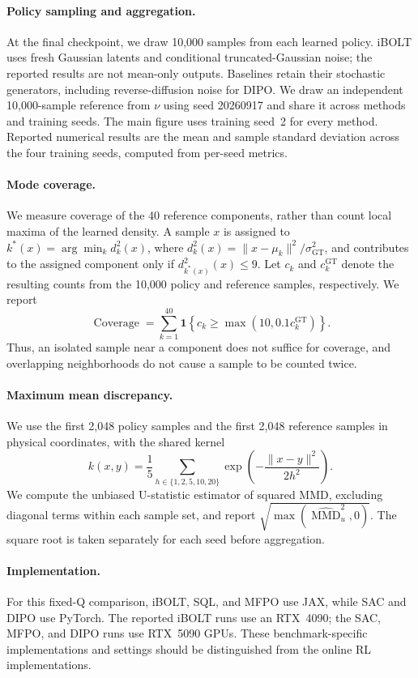\paragraph{Policy sampling and aggregation.}
At the final checkpoint, we draw 10{,}000 samples from each learned policy.
iBOLT uses fresh Gaussian latents and conditional truncated-Gaussian noise;
the reported results are not mean-only outputs. Baselines retain their
stochastic generators, including reverse-diffusion noise for DIPO.
We draw an independent 10{,}000-sample reference from $\nu$ using seed
20260917 and share it across methods and training seeds.
The main figure uses training seed~2 for every method.
Reported numerical results are the mean and sample standard deviation
across the four training seeds, computed from per-seed metrics.

\paragraph{Mode coverage.}
We measure coverage of the 40 reference components, rather than count
local maxima of the learned density. A sample $x$ is assigned to
$k^*(x)=\arg\min_k d_k^2(x)$, where
$d_k^2(x)=\|x-\mu_k\|^2/\sigma_{\mathrm{GT}}^2$,
and contributes to the assigned component only if $d_{k^*(x)}^2(x)\leq 9$.
Let $c_k$ and $c_k^{\mathrm{GT}}$ denote the resulting counts from the
10{,}000 policy and reference samples, respectively. We report
\begin{equation}
\operatorname{Coverage}
=\sum_{k=1}^{40}\mathbf{1}\!\left\{
c_k\geq\max(10,0.1c_k^{\mathrm{GT}})\right\}.
\end{equation}
Thus, an isolated sample near a component does not suffice for coverage,
and overlapping neighborhoods do not cause a sample to be counted twice.

\paragraph{Maximum mean discrepancy.}
We use the first 2{,}048 policy samples and the first 2{,}048 reference
samples in physical coordinates, with the shared kernel
\begin{equation}
k(x,y)=\frac{1}{5}\sum_{h\in\{1,2,5,10,20\}}
\exp\!\left(-\frac{\|x-y\|^2}{2h^2}\right).
\end{equation}
We compute the unbiased U-statistic estimator of squared MMD, excluding
diagonal terms within each sample set, and report
$\sqrt{\max(\widehat{\operatorname{MMD}}_u^2,0)}$.
The square root is taken separately for each seed before aggregation.

\paragraph{Implementation.}
For this fixed-Q comparison, iBOLT, SQL, and MFPO use JAX, while SAC and
DIPO use PyTorch. The reported iBOLT runs use an RTX~4090; the SAC, MFPO,
and DIPO runs use RTX~5090 GPUs. These benchmark-specific implementations
and settings should be distinguished from the online RL implementations.
